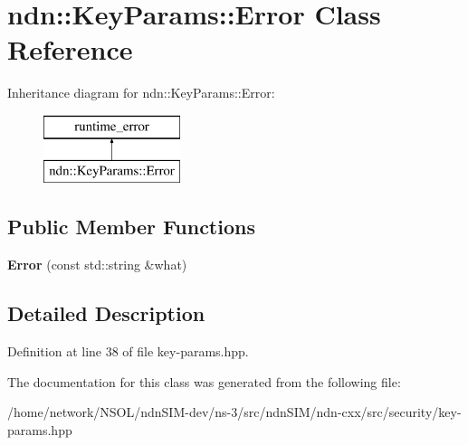 \hypertarget{classndn_1_1KeyParams_1_1Error}{}\section{ndn\+:\+:Key\+Params\+:\+:Error Class Reference}
\label{classndn_1_1KeyParams_1_1Error}
Inheritance diagram for ndn\+:\+:Key\+Params\+:\+:Error\+:\begin{figure}[H]
\begin{center}
\leavevmode
\includegraphics[height=2.000000cm]{classndn_1_1KeyParams_1_1Error}
\end{center}
\end{figure}
\subsection*{Public Member Functions}
\begin{DoxyCompactItemize}
\item 
{\bfseries Error} (const std\+::string \&what)\hypertarget{classndn_1_1KeyParams_1_1Error_ae9283657d9e1e4ef23fae3616a1eaccd}{}\label{classndn_1_1KeyParams_1_1Error_ae9283657d9e1e4ef23fae3616a1eaccd}

\end{DoxyCompactItemize}


\subsection{Detailed Description}


Definition at line 38 of file key-\/params.\+hpp.



The documentation for this class was generated from the following file\+:\begin{DoxyCompactItemize}
\item 
/home/network/\+N\+S\+O\+L/ndn\+S\+I\+M-\/dev/ns-\/3/src/ndn\+S\+I\+M/ndn-\/cxx/src/security/key-\/params.\+hpp\end{DoxyCompactItemize}

